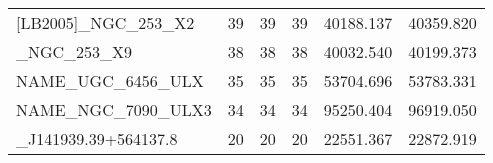 \begin{tabular}{lrrrrr}
          [LB2005]\_NGC\_253\_X2 &     39 &          39 &         39 &       40188.137 &      40359.820 \\
          [LB2005]\_NGC\_253\_X9 &     38 &          38 &         38 &       40032.540 &      40199.373 \\
            NAME\_UGC\_6456\_ULX &     35 &          35 &         35 &       53704.696 &      53783.331 \\
           NAME\_NGC\_7090\_ULX3 &     34 &          34 &         34 &       95250.404 &      96919.050 \\
[SST2011]\_J141939.39+564137.8 &     20 &          20 &         20 &       22551.367 &      22872.919 \\
\bottomrule
\end{tabular}

